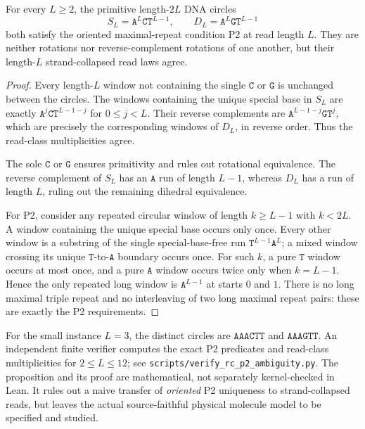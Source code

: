 \begin{proposition}
\label{prop:rc-p2-ambiguity}
For every $L\ge2$, the primitive length-$2L$ DNA circles
\[
 S_L=\texttt{A}^L\texttt{C}\texttt{T}^{L-1},
 \qquad
 D_L=\texttt{A}^L\texttt{G}\texttt{T}^{L-1}
\]
both satisfy the oriented maximal-repeat condition P2 at read
length $L$. They are neither rotations nor reverse-complement
rotations of one another, but their length-$L$ strand-collapsed
read laws agree.
\end{proposition}
\begin{proof}
Every length-$L$ window not containing the single
$\texttt{C}$ or $\texttt{G}$ is unchanged between
the circles. The windows containing the unique special
base in $S_L$ are exactly
$\texttt{A}^j\texttt{C}\texttt{T}^{L-1-j}$
for $0\le j<L$. Their reverse complements are
$\texttt{A}^{L-1-j}\texttt{G}\texttt{T}^j$,
which are precisely the corresponding windows of $D_L$,
in reverse order. Thus the read-class multiplicities agree.

The sole $\texttt{C}$ or $\texttt{G}$ ensures
primitivity and rules out rotational equivalence.
The reverse complement of $S_L$ has an
$\texttt{A}$ run of length $L-1$, whereas $D_L$
has a run of length $L$, ruling out the remaining
dihedral equivalence.

For P2, consider any repeated circular window of length
$k\ge L-1$ with $k<2L$. A window containing the unique
special base occurs only once. Every other window is
a substring of the single special-base-free run
$\texttt{T}^{L-1}\texttt{A}^L$; a mixed window
crossing its unique $\texttt{T}$-to-$\texttt{A}$
boundary occurs once. For such $k$, a pure
$\texttt{T}$ window occurs at most once, and a pure
$\texttt{A}$ window occurs twice only when $k=L-1$.
Hence the only repeated long window is
$\texttt{A}^{L-1}$ at starts $0$ and $1$.
There is no long maximal triple repeat and no
interleaving of two long maximal repeat pairs:
these are exactly the P2 requirements.
\end{proof}

For the small instance $L=3$, the distinct circles are
$\texttt{AAACTT}$ and $\texttt{AAAGTT}$.
An independent finite verifier computes the exact
P2 predicates and read-class multiplicities for
$2\le L\le12$; see
\texttt{scripts/verify\_rc\_p2\_ambiguity.py}.
The proposition and its proof are mathematical, not
separately kernel-checked in Lean. It rules out
a naive transfer of \emph{oriented} P2 uniqueness
to strand-collapsed reads, but leaves the actual
source-faithful physical molecule model to be specified
and studied.

